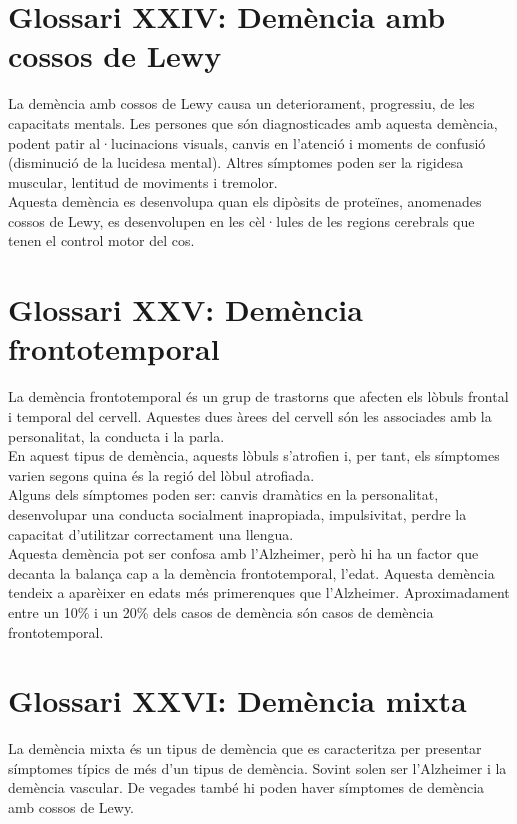 \documentclass[a4paper,12pt]{report}
\begin{document}
\section*{Glossari XXIV: Demència amb cossos de Lewy}
La demència amb cossos de Lewy causa un deteriorament, progressiu, de les capacitats mentals. Les persones que són diagnosticades amb aquesta demència, podent patir al·lucinacions visuals, canvis en l'atenció i moments de confusió (disminució de la lucidesa mental). Altres símptomes poden ser la rigidesa muscular, lentitud de moviments i tremolor.\\
Aquesta demència es desenvolupa quan els dipòsits de proteïnes, anomenades cossos de Lewy, es desenvolupen en les cèl·lules de les regions cerebrals que tenen el control motor del cos.
\section*{Glossari XXV: Demència frontotemporal}
La demència frontotemporal és un grup de trastorns que afecten els lòbuls frontal i temporal del cervell. Aquestes dues àrees del cervell són les associades amb la personalitat, la conducta i la parla.\\
En aquest tipus de demència, aquests lòbuls s'atrofien i, per tant, els símptomes varien segons quina és la regió del lòbul atrofiada.\\
Alguns dels símptomes poden ser: canvis dramàtics en la personalitat, desenvolupar una conducta socialment inapropiada, impulsivitat, perdre la capacitat d'utilitzar correctament una llengua.\\
Aquesta demència pot ser confosa amb l'Alzheimer, però hi ha un factor que decanta la balança cap a la demència frontotemporal, l'edat. Aquesta demència tendeix a aparèixer en edats més primerenques que l'Alzheimer. Aproximadament entre un 10\% i un 20\% dels casos de demència són casos de demència frontotemporal.
\section*{Glossari XXVI: Demència mixta}
La demència mixta és un tipus de demència que es caracteritza per presentar símptomes típics de més d'un tipus de demència. Sovint solen ser l'Alzheimer i la demència vascular. De vegades també hi poden haver símptomes de demència amb cossos de Lewy.
\end{document}
